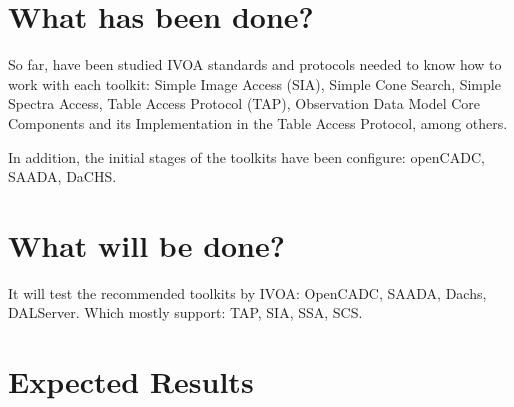 \section{What has been done?}



So far, have been studied IVOA standards and protocols needed to know how to
work with each toolkit: Simple Image Access (SIA), Simple Cone Search, Simple
Spectra Access, Table Access Protocol (TAP), Observation Data Model Core
Components and its Implementation in the Table Access Protocol, among others.

In addition, the initial stages of the toolkits have been configure: openCADC,
SAADA, DaCHS. 

\section{What will be done?}


It will test the recommended toolkits by IVOA: OpenCADC, SAADA, Dachs,
DALServer. Which mostly support: TAP, SIA, SSA, SCS.

\section{Expected Results}


